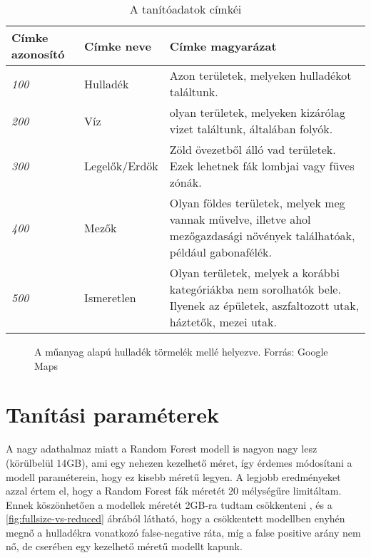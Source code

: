 \begin{table}[H]
	\centering
	\begin{tabular}{ | p{} | p{} | p{} | }
		\hline
		\textbf{Címke azonosító} & \textbf{Címke neve} & \textbf{Címke magyarázat} \\
		\hline \hline
		\emph{100} & Hulladék & Azon területek, melyeken hulladékot találtunk. \\
		\hline
		\emph{200} & Víz & olyan területek, melyeken kizárólag vizet találtunk, általában folyók. \\
		\hline
		\emph{300} & Legelők/Erdők & Zöld övezetből álló vad területek. Ezek lehetnek fák lombjai vagy füves zónák. \\
		\hline
        \emph{400} & Mezők & Olyan földes területek, melyek meg vannak művelve, illetve ahol mezőgazdasági növények találhatóak, például gabonafélék. \\
		\hline
        \emph{500} & Ismeretlen & Olyan területek, melyek a korábbi kategóriákba nem sorolhatók bele. Ilyenek az épületek, aszfaltozott utak, háztetők, mezei utak. \\
		\hline
	\end{tabular}
	\caption{A tanítóadatok címkéi}
	\label{tab:waste-detection-labels}
\end{table}

\begin{figure}[H]
	\centering
	\hspace{5pt}
	\caption{A műanyag alapú hulladék törmelék mellé helyezve. Forrás: Google Maps}
	\label{fig:waste-vs-debris}
\end{figure}

\section{Tanítási paraméterek}

A nagy adathalmaz miatt a Random Forest modell is nagyon nagy lesz (körülbelül 14GB), ami egy nehezen kezelhető méret, így érdemes módosítani a modell paraméterein, hogy ez kisebb méretű legyen. A legjobb eredményeket azzal értem el, hogy a Random Forest fák méretét 20 mélységűre limitáltam. Ennek köszönhetően a modellek méretét 2GB-ra tudtam csökkenteni , és a \ref{fig:fullsize-vs-reduced} ábrából látható, hogy a csökkentett modellben enyhén megnő a hulladékra vonatkozó false-negative ráta, míg a false positive arány nem nő, de cserében egy kezelhető méretű modellt kapunk.

